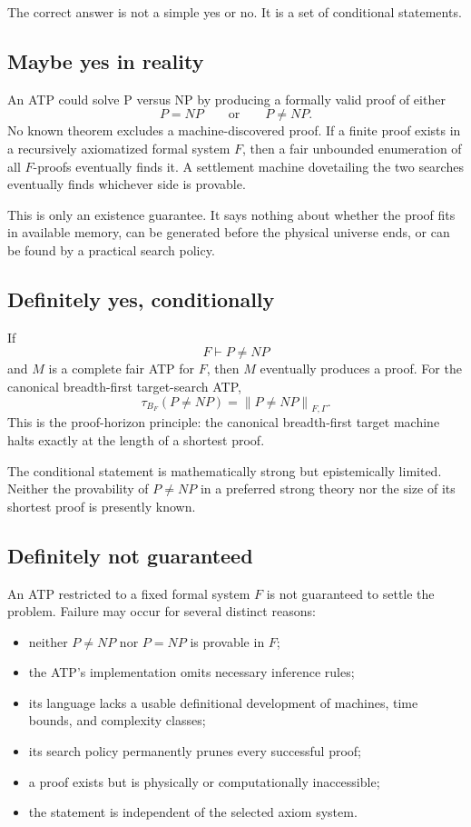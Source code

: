 \documentclass[11pt,letterpaper]{article}
\theoremstyle{named}
\newcommand{\prooflen}[2]{\left\lVert #1\right\rVert_{#2}}
\begin{document}
The correct answer is not a simple yes or no. It is a set of conditional statements.

\subsection{Maybe yes in reality}

An ATP could solve P versus NP by producing a formally valid proof of either
\[
P=NP
\qquad\text{or}\qquad
P\ne NP.
\]
No known theorem excludes a machine-discovered proof. If a finite proof exists in a recursively axiomatized formal system $F$, then a fair unbounded enumeration of all $F$-proofs eventually finds it. A settlement machine dovetailing the two searches eventually finds whichever side is provable.

This is only an existence guarantee. It says nothing about whether the proof fits in available memory, can be generated before the physical universe ends, or can be found by a practical search policy.

\subsection{Definitely yes, conditionally}

If
\[
F\vdash P\ne NP
\]
and $M$ is a complete fair ATP for $F$, then $M$ eventually produces a proof. For the canonical breadth-first target-search ATP,
\[
\tau_{B_F}(P\ne NP)
=
\prooflen{P\ne NP}{F,\Gamma}.
\]
This is the proof-horizon principle: the canonical breadth-first target machine halts exactly at the length of a shortest proof.

The conditional statement is mathematically strong but epistemically limited. Neither the provability of $P\ne NP$ in a preferred strong theory nor the size of its shortest proof is presently known.

\subsection{Definitely not guaranteed}

An ATP restricted to a fixed formal system $F$ is not guaranteed to settle the problem. Failure may occur for several distinct reasons:

\begin{itemize}
\item neither $P\ne NP$ nor $P=NP$ is provable in $F$;
\item the ATP's implementation omits necessary inference rules;
\item its language lacks a usable definitional development of machines, time bounds, and complexity classes;
\item its search policy permanently prunes every successful proof;
\item a proof exists but is physically or computationally inaccessible;
\item the statement is independent of the selected axiom system.
\end{itemize}
\end{document}
